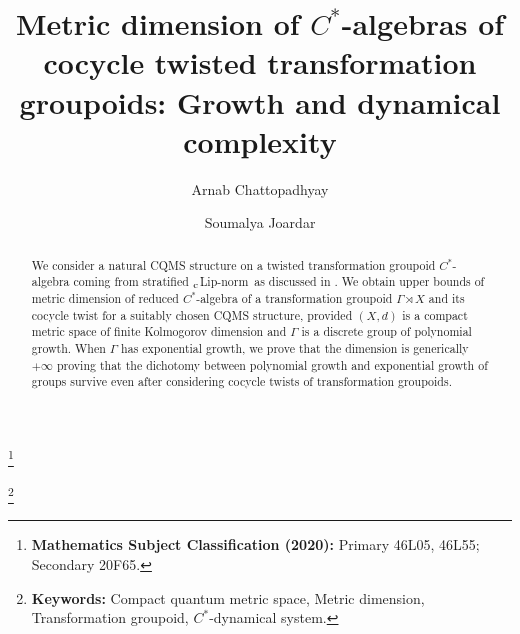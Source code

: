 \documentclass[a4paper,11pt,reqno]{amsart}
\title[Metric dimension of $C^{\ast}$-algebras of cocycle twisted transformation groupoids]{Metric dimension of $C^{\ast}$-algebras of cocycle twisted transformation groupoids: Growth and dynamical complexity}
\author[A. Chattopadhyay]{Arnab Chattopadhyay}
\author[S. Joardar]{Soumalya Joardar}
\newcommand{\blfootnote}[1]{%
  \begingroup
  \renewcommand\thefootnote{}\footnote{#1}%
  \addtocounter{footnote}{-1}%
  \endgroup
}
\theoremstyle{plain}
\theoremstyle{mainthmstyle}
\theoremstyle{named}
\numberwithin{equation}{section}
\newcommand{\clipnorm}{$_{\text{\rm c}}$Lip-norm}
\begin{document}
\begin{abstract}
 We consider a natural CQMS structure on a twisted transformation groupoid $C^{\ast}$-algebra coming from stratified \clipnorm\ as discussed in \cite{austad2026quantum}. We obtain upper bounds of metric dimension of reduced $C^{\ast}$-algebra of a transformation groupoid $\Gamma\rtimes X$ and its cocycle twist for a suitably chosen CQMS structure, provided $(X,d)$ is a compact metric space of finite Kolmogorov dimension and $\Gamma$ is a discrete group of polynomial growth. When $\Gamma$ has exponential growth, we prove that the dimension is generically $+\infty$ proving that the dichotomy between polynomial growth and exponential growth of groups survive even after considering cocycle twists of transformation groupoids. 
\end{abstract}



\maketitle
\blfootnote{\textbf{Mathematics Subject Classification (2020):} Primary 46L05, 46L55; Secondary 20F65.}
\blfootnote{\textbf{Keywords:} Compact quantum metric space, Metric dimension, Transformation groupoid, $C^{\ast}$-dynamical system.}
\end{document}
